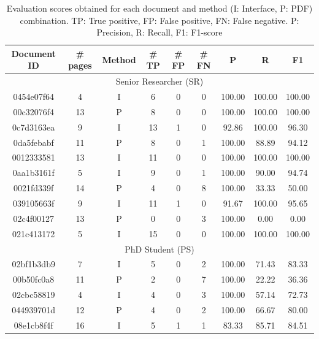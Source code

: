 \begin{table}[htpb]
\centering
\small
\caption{Evaluation scores obtained for each document and method (I: Interface, P: PDF) combination. TP: True positive, FP: False positive, FN: False negative. P: Precision, R: Recall, F1: F1-score }
\label{tab:curation-evaluation-detailed-results}
\begin{tabular}{cc|c|ccc|ccc}
\textbf{Document ID} & \# \textbf{pages} & \textbf{Method} & \# \textbf{TP}	& \# \textbf{FP}	& \# \textbf{FN}	& \textbf{P}	& \textbf{R}	& \textbf{F1} \\
\toprule
\multicolumn{9}{c}{Senior Researcher (SR)}\\
\midrule
0454e07f64  & 4     & I     & 6     & 0     &   0   & 100.00    & 100.00    & 100.00 \\
00c32076f4  & 13    & P     & 8     & 0     &   0   & 100.00    & 100.00    & 100.00 \\
0c7d3163ea  & 9     & I     & 13    & 1     &   0   & 92.86     & 100.00    & 96.30 \\
0da5febabf  & 11    & P     & 8     & 0     &   1   & 100.00    & 88.89     & 94.12 \\
0012333581  & 13    & I     & 11    & 0     &   0   & 100.00    & 100.00    & 100.00 \\
0aa1b3161f  & 5     & I     & 9     & 0     &   1   & 100.00    & 90.00     & 94.74 \\
0021fd339f  & 14    & P     & 4     & 0     &   8   & 100.00    & 33.33     & 50.00 \\
039105663f  & 9     & I     & 11    & 1     &   0   & 91.67     & 100.00    & 95.65 \\
02c4f00127  & 13    & P     & 0     & 0     &   3   & 100.00    & 0.00      & 0.00 \\
021c413172  & 5     & I     & 15    & 0     &   0   & 100.00    & 100.00    & 100.00 \\
\midrule
\multicolumn{9}{c}{PhD Student (PS)}\\
\midrule
02bf1b3db9  & 7     & I     & 5     & 0     &   2   & 100.00    & 71.43     & 83.33 \\
00b50fc0a8  & 11    & P     & 2     & 0     &   7   & 100.00    & 22.22     & 36.36 \\
02cbc58819  & 4     & I     & 4     & 0     &   3   & 100.00    & 57.14     & 72.73 \\
044939701d  & 12    & P     & 4     & 0     &   2   & 100.00    & 66.67     & 80.00 \\
08e1cb8f4f  & 16    & I     & 5     & 1     &   1   & 83.33     & 85.71     & 84.51 \\

\end{tabular}
\end{table}
